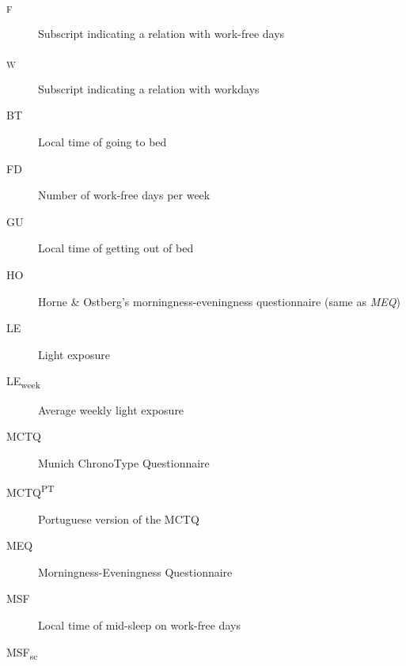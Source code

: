 \documentclass[
  12pt,
  a4paper,
  oneside]{tesesusp}
\begin{document}
\setlength{\absparsep}{12pt}
\begin{siglas}
\begin{description}
\item[\textsubscript{F}]
\hspace{20cm}

Subscript indicating a relation with work-free days
\item[\textsubscript{W}]
\hspace{20cm}

Subscript indicating a relation with workdays
\item[BT]
\hspace{20cm}

Local time of going to bed
\item[FD]
\hspace{20cm}

Number of work-free days per week
\item[GU]
\hspace{20cm}

Local time of getting out of bed
\item[HO]
\hspace{20cm}

Horne \& Ostberg's morningness-eveningness questionnaire (same as
\emph{MEQ})
\item[LE]
\hspace{20cm}

Light exposure
\item[LE\textsubscript{week}]
\hspace{20cm}

Average weekly light exposure
\item[MCTQ]
\hspace{20cm}

Munich ChronoType Questionnaire
\item[MCTQ\textsuperscript{PT}]
\hspace{20cm}

Portuguese version of the MCTQ
\item[MEQ]
\hspace{20cm}

Morningness-Eveningness Questionnaire
\item[MSF]
\hspace{20cm}

Local time of mid-sleep on work-free days
\item[MSF\textsubscript{sc}]
\hspace{20cm}


\end{description}
\end{siglas}
\end{document}

